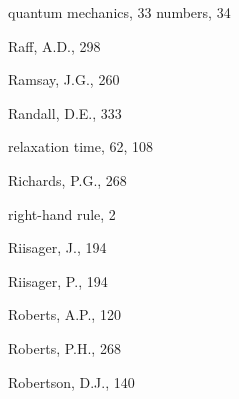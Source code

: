 \documentclass[,plain]{tauxe}
\begin{document}
\begin{theindex}
  \indexspace

  \item quantum
    \subitem mechanics, 33
    \subitem numbers, 34

  \indexspace

  \item Raff, A.D., 298
  \item Ramsay, J.G., 260
  \item Randall, D.E., 333
  \item relaxation time, 62, 108
  \item Richards, P.G., 268
  \item right-hand rule, 2
  \item Riisager, J., 194
  \item Riisager, P., 194
  \item Roberts, A.P., 120
  \item Roberts, P.H., 268
  \item Robertson, D.J., 140

  \indexspace


\end{theindex}
\end{document}
